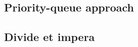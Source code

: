 \begin{minipage}{\linewidth}
	
\end{minipage}


\subsection{Priority-queue approach}
\label{merge_k_sorted_lists:sec:priorityqueue}

\subsection{Divide et impera}
\label{merge_k_sorted_lists:sec:divideetimpera}

